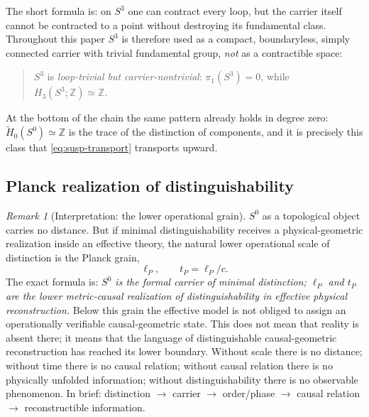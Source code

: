 \documentclass[11pt,a4paper]{article}
\theoremstyle{definition}
\theoremstyle{remark}
\newtheorem{remark}[theorem]{Remark}
\newcommand{\Szero}{S^{0}}
\newcommand{\Sthree}{S^{3}}
\newcommand{\Z}{\mathbb{Z}}
\begin{document}
The short formula is: on $\Sthree$ one can contract every loop, but the carrier itself cannot be
contracted to a point without destroying its fundamental class.  Throughout this paper
$\Sthree$ is therefore used as a compact, boundaryless, simply connected carrier with trivial
fundamental group, \emph{not} as a contractible space:
\begin{quote}
$\Sthree$ is \emph{loop-trivial but carrier-nontrivial}:
$\pi_{1}(\Sthree)=0$, while $H_{3}(\Sthree;\Z)\simeq\Z$.
\end{quote}
At the bottom of the chain the same pattern already holds in degree zero:
$\widetilde H_{0}(\Szero)\simeq\Z$ is the trace of the distinction of components, and it is
precisely this class that \eqref{eq:susp-transport} transports upward.

\subsection{Planck realization of distinguishability}

\begin{remark}[Interpretation: the lower operational grain]
$\Szero$ as a topological object carries no distance.  But if minimal distinguishability
receives a physical-geometric realization inside an effective theory, the natural lower
operational scale of distinction is the Planck grain,
\begin{equation}
\ell_{P},\qquad t_{P}=\ell_{P}/c .
\end{equation}
The exact formula is: \emph{$\Szero$ is the formal carrier of minimal distinction; $\ell_{P}$
and $t_{P}$ are the lower metric-causal realization of distinguishability in effective physical
reconstruction.}  Below this grain the effective model is not obliged to assign an operationally
verifiable causal-geometric state.  This does not mean that reality is absent there; it means
that the language of distinguishable causal-geometric reconstruction has reached its lower
boundary.  Without scale there is no distance; without time there is no causal relation; without
causal relation there is no physically unfolded information; without distinguishability there is
no observable phenomenon.  In brief: distinction $\to$ carrier $\to$ order/phase $\to$ causal
relation $\to$ reconstructible information.
\end{remark}
\end{document}
